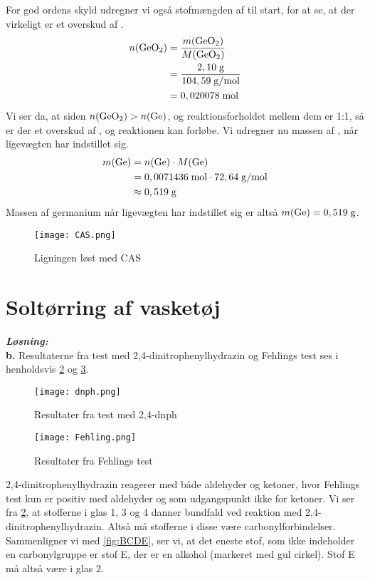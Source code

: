\documentclass{report}
\newcommand{\sol}{\setlength{\parindent}{0cm}\textbf{\textit{Løsning:}}\setlength{\parindent}{1cm}}
\begin{document}
For god ordens skyld udregner vi også stofmængden af  til start, for at se, at der virkeligt er et overskud af .
\begin{equation*}
\begin{split}
  n(\ce{GeO2} )&=\frac{m(\ce{GeO2} )}{M(\ce{GeO2} )}\\
  &=\frac{2,10 \;\unit{g} }{104,59 \;\unit{g/mol} }\\
  &=0,020078 \;\unit{mol} 
\end{split}
\end{equation*}
Vi ser da, at siden $n(\ce{GeO2} )>n(\ce{Ge} )$, og reaktionsforholdet mellem dem er 1:1, så er der et overskud af , og reaktionen kan forløbe.
Vi udregner nu massen af , når ligevægten har indstillet sig.
\begin{equation*}
\begin{split}
  m(\ce{Ge} )&=n(\ce{Ge} ) \cdot M(\ce{Ge} )\\
  &=0,0071436 \;\unit{mol} \cdot 72,64 \;\unit{g/mol} \\
  &\approx 0,519 \;\unit{g} 
\end{split}
\end{equation*}
Massen af germanium når ligevægten har indstillet sig er altså $m(\ce{Ge} )=0,519 \;\unit{g} $.
\begin{figure}[H]
\begin{center}
  \texttt{[image: CAS.png]}
\end{center}
\caption{Ligningen løst med CAS}
\label{fig:CAS}
\end{figure}
\section*{Soltørring af vasketøj}
\sol \\
\textbf{b.}
Resultaterne fra test med 2,4-dinitrophenylhydrazin og Fehlings test ses i henholdsvis \cref{fig:dnph} og \cref{fig:Fehling}.
\begin{multicols}{2}
 \begin{figure}[H]
\begin{center}
  \texttt{[image: dnph.png]}
\end{center}
\caption{Resultater fra test med 2,4-dnph}
\label{fig:dnph}
\end{figure}
\begin{figure}[H]
\begin{center}
  \texttt{[image: Fehling.png]}
\end{center}
\caption{Resultater fra Fehlings test}
\label{fig:Fehling}
\end{figure}
\end{multicols}
2,4-dinitrophenylhydrazin reagerer med både aldehyder og ketoner, hvor Fehlings test kun er positiv med aldehyder og som udgangspunkt ikke for ketoner.
Vi ser fra \cref{fig:dnph}, at stofferne i glas 1, 3 og 4 danner bundfald ved reaktion med 2,4-dinitrophenylhydrazin.
Altså må stofferne i disse være carbonylforbindelser.
Sammenligner vi med \cref{fig:BCDE}, ser vi, at det eneste stof, som ikke indeholder en carbonylgruppe er stof E, der er en alkohol (markeret med gul cirkel).
Stof E må altså være i glas 2.
\end{document}

